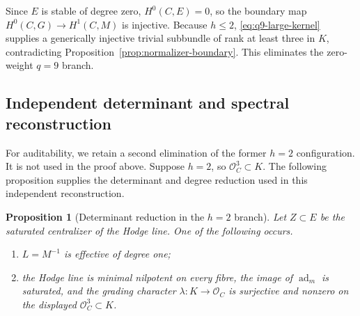 \documentclass[11pt]{article}
\newtheorem{proposition}[theorem]{Proposition}
\theoremstyle{definition}
\newcommand{\Ocal}{\mathcal O}
\newcommand{\ad}{\operatorname{ad}}
\begin{document}
Since $E$ is stable of degree zero, $H^0(C,E)=0$, so the boundary map
$H^0(C,G)\to H^1(C,M)$ is injective.  Because $h\le2$,
\eqref{eq:q9-large-kernel} supplies a generically injective trivial
subbundle of rank at least three in $K$, contradicting
Proposition~\ref{prop:normalizer-boundary}.  This eliminates the
zero-weight $q=9$ branch.

\subsection{Independent determinant and spectral reconstruction}

For auditability, we retain a second elimination of the former $h=2$
configuration.  It is not used in the proof above.  Suppose $h=2$, so
$\Ocal_C^3\subset K$.  The following proposition supplies the determinant
and degree reduction used in this independent reconstruction.

\begin{proposition}[Determinant reduction in the $h=2$ branch]
\label{prop:q9-reduction}
Let $Z\subset E$ be the saturated centralizer of the Hodge line.  One of the
following occurs.
\begin{enumerate}[label=\textup{(\roman*)}]
\item $L=M^{-1}$ is effective of degree one;
\item the Hodge line is minimal nilpotent on every fibre, the image of
$\ad_m$ is saturated, and the grading character
$\lambda:K\to\Ocal_C$ is surjective and nonzero on the displayed
$\Ocal_C^3\subset K$.
\end{enumerate}
\end{proposition}
\end{document}
